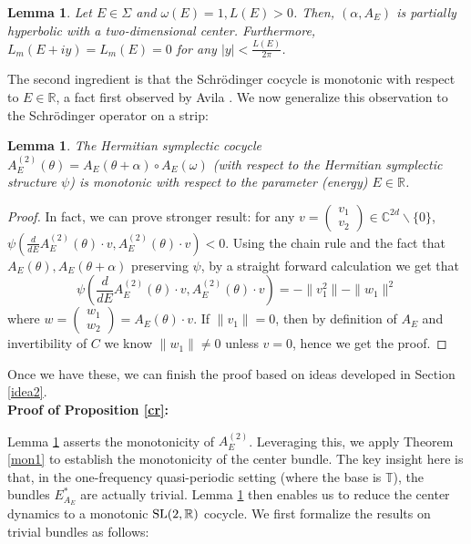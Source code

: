 \documentclass[11pt]{amsart}
\newtheorem{lemma}[theorem]{Lemma}
\theoremstyle{remark}
\theoremstyle{definition}
\newcommand{\CC}{{\mathbb C}}
\newcommand{\SL}{{\rm SL}}
\begin{document}
\begin{lemma}\cite{GJ,GJYZ}\label{censub}
Let \( E \in \Sigma \) and \( \omega(E) = 1, L(E) > 0 \). Then, \( (\alpha, A_E) \) is partially hyperbolic with a two-dimensional center. Furthermore, \( L_m(E + iy) = L_m(E) = 0 \) for any \( |y| < \frac{L(E)}{2\pi} \).
\end{lemma}

The second ingredient is that the Schrödinger cocycle is monotonic with respect to $ E \in \mathbb{R} $, a fact first observed by Avila \cite{A09}. We now generalize this observation to the Schrödinger operator on a strip:

\begin{lemma}\label{monsc}
The Hermitian symplectic cocycle \( A_E^{(2)}(\theta) = A_E(\theta + \alpha) \circ A_E(\omega) \) (with respect to the Hermitian symplectic structure \( \psi \)) is monotonic with respect to the parameter (energy) \( E \in \mathbb{R} \).
\end{lemma}
	\begin{proof}In fact, we can prove stronger result:  for any $v=\begin{pmatrix}v_1\\ v_2\end{pmatrix} \in \CC^{2d}\backslash\{0\}$, $\psi(\frac{d}{dE}A_E^{(2)}(\theta)\cdot v, A_E^{(2)}(\theta)\cdot v)<0$. Using the chain rule and the fact that $A_E(\theta),A_E(\theta+\alpha)$ preserving $\psi$, by a straight forward calculation we get that 
		$$\psi(\frac{d}{dE}A_E^{(2)}(\theta)\cdot v, A_E^{(2)}(\theta)\cdot v)=-\|v_1^2\|-\|w_1\|^2$$where $w=\begin{pmatrix}w_1\\w_2\end{pmatrix}=A_E(\theta)\cdot v$. If $\|v_1\|=0$, then by definition of $A_E$ and invertibility of $C$ we know $\|w_1\| \neq 0$ unless $v=0$, hence we get the proof.
	\end{proof}



Once we have these, we can finish the proof based on ideas developed in Section \ref{idea2}.\\



	





\textbf{Proof of Proposition \ref{cr}:}

Lemma \ref{monsc} asserts the monotonicity of \(A_E^{(2)}\). Leveraging this, we apply Theorem \ref{mon1} to establish the monotonicity of the center bundle. The key insight here is that, in the one-frequency quasi-periodic setting (where the base is \(\mathbb{T}\)), the bundles \(E_{A_E}^{*}\) are actually trivial. Lemma \ref{censub} then enables us to reduce the center dynamics to a monotonic \(\SL(2,\mathbb{R})\) cocycle. We first formalize the results on trivial bundles as follows:
\end{document}
